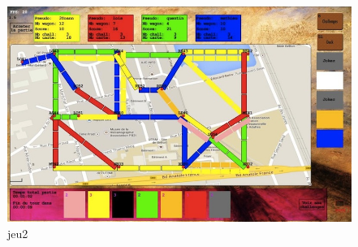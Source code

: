 \documentclass{report}
\begin{document}
\begin{figure}[H]
\center
\includegraphics[width=450pt]{jeu2.jpg}
\caption{jeu2}
\label{jeu2}
\end{figure}
\end{document}
